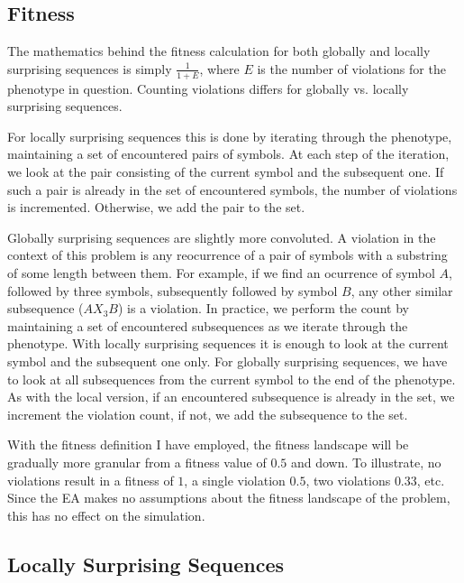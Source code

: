 \documentclass[twoside]{article}
\begin{document}
\begin{multicols}{2}
    \subsection{Fitness}

    The mathematics behind the fitness calculation for both globally and locally surprising sequences is simply $\frac{1}{1 + E}$, where $E$ is the number of violations for the phenotype in question.
    Counting violations differs for globally vs. locally surprising sequences.


    For locally surprising sequences this is done by iterating through the phenotype, maintaining a set of encountered pairs of symbols.
    At each step of the iteration, we look at the pair consisting of the current symbol and the subsequent one.
    If such a pair is already in the set of encountered symbols, the number of violations is incremented.
    Otherwise, we add the pair to the set.

    Globally surprising sequences are slightly more convoluted.
    A violation in the context of this problem is any reocurrence of a pair of symbols with a substring of some length between them.
    For example, if we find an ocurrence of symbol $A$, followed by three symbols, subsequently followed by symbol $B$, any other similar subsequence ($AX_{3}B$) is a violation.
    In practice, we perform the count by maintaining a set of encountered subsequences as we iterate through the phenotype.
    With locally surprising sequences it is enough to look at the current symbol and the subsequent one only.
    For globally surprising sequences, we have to look at all subsequences from the current symbol to the end of the phenotype.
    As with the local version, if an encountered subsequence is already in the set, we increment the violation count, if not, we add the subsequence to the set.

    With the fitness definition I have employed, the fitness landscape will be gradually more granular from a fitness value of $0.5$ and down.
    To illustrate, no violations result in a fitness of $1$, a single violation $0.5$, two violations $0.33$, etc.
    Since the EA makes no assumptions about the fitness landscape of the problem, this has no effect on the simulation.

    \subsection{Locally Surprising Sequences}


\end{multicols}
\end{document}
